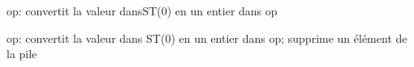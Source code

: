   \item[FIST] op: convertit  la valeur dansST(0) en un entier dans op
  \item[FISTP] op: convertit la valeur dans ST(0) en un entier dans op;
  supprime un élément de la pile
